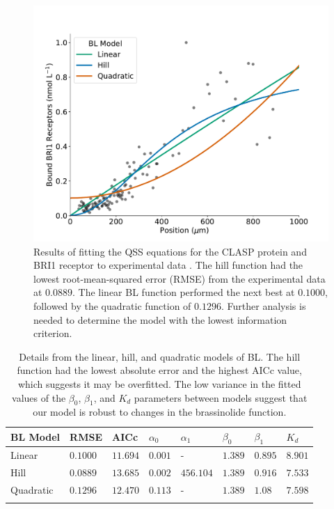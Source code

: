 \documentclass[referee,pdflatex,sn-mathphys-num]{sn-jnl}
\begin{document}
\begin{figure}
  \centering
  \includegraphics[width=\textwidth]{bes1-functions.pdf}
  \caption{Results of fitting the QSS equations for the CLASP protein and BRI1 receptor to experimental data \cite{vukasinovic2021}.
  The hill function had the lowest root-mean-squared error (RMSE) from the experimental data at $0.0889$.
The linear BL function performed the next best at $0.1000$, followed by the quadratic function of $0.1296$.
Further analysis is needed to determine the model with the lowest information criterion. }
  \label{bl-functions}
\end{figure}

\begin{table}[ht]
\caption{Details from the linear, hill, and quadratic models of BL.
The hill function had the lowest absolute error and the highest AICc value, which suggests it may be overfitted.
The low variance in the fitted values of the $\beta_{0}$, $\beta_{1}$, and $K_{d}$ parameters between models suggest that our model is robust to changes in the brassinolide function. }
\label{bl-fits}
\begin{tabular}{@{}llllllll@{}}
\toprule
BL Model & RMSE & AICc & $\alpha_{0}$ & $\alpha_{1}$ & $\beta_{0}$ & $\beta_{1}$ & $K_{d}$ \\
\midrule
Linear & $0.1000$ & $11.694$ & $0.001$ & - & $1.389$ & $0.895$ & $8.901$ \\
Hill & $0.0889$ & $13.685$ & $0.002$ & $456.104$ & $1.389$ & $0.916$ & $7.533$ \\
Quadratic & $0.1296$ & $12.470$ & $0.113$ & - & $1.389$ & $1.08$ & $7.598$ \\
\botrule
\end{tabular}
\end{table}
\end{document}
